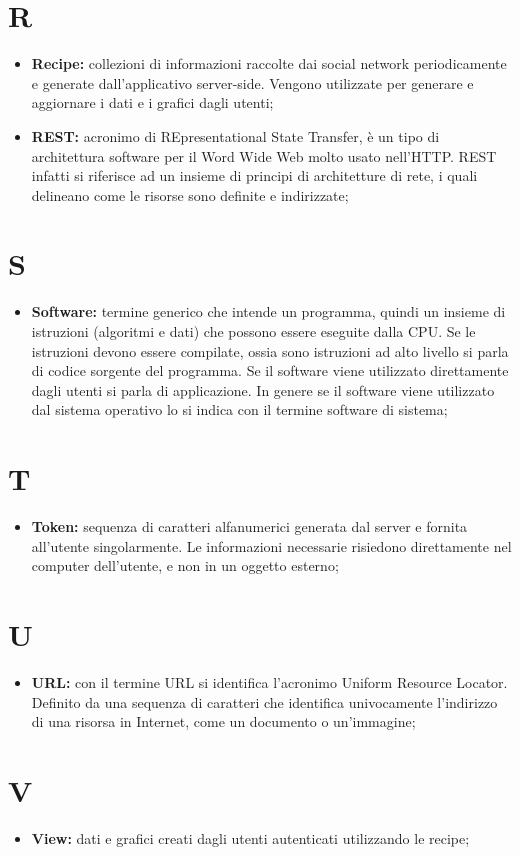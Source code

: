 	\section*{\Huge R} %
		\begin{itemize}
			\item \textbf{Recipe:} collezioni di informazioni raccolte dai social network periodicamente e generate dall'applicativo server-side. Vengono utilizzate per generare e aggiornare i dati e i grafici dagli utenti;
			\item \textbf{REST:} acronimo di REpresentational State Transfer, è un tipo di architettura software per il Word Wide Web molto usato nell'HTTP. REST infatti si riferisce ad un insieme di principi di architetture di rete, i quali delineano come le risorse sono definite e indirizzate;
			\end{itemize}


	\section*{\Huge S} %
		\begin{itemize}
			\item \textbf{Software:} termine generico che intende un programma, quindi un insieme di istruzioni (algoritmi e dati) che possono essere eseguite dalla CPU. Se le istruzioni devono essere compilate, ossia sono istruzioni ad alto livello si parla di codice sorgente del programma. Se il software viene utilizzato direttamente dagli utenti si parla di applicazione. In genere se il software viene utilizzato dal sistema operativo lo si indica con il termine software di sistema;
		\end{itemize}


	\section*{\Huge T} %
		\begin{itemize}
			\item \textbf{Token:} sequenza di caratteri alfanumerici generata dal server e fornita all'utente singolarmente. Le informazioni necessarie risiedono direttamente nel computer dell'utente, e non in un oggetto esterno;
		\end{itemize}


	\section*{\Huge U} %
		\begin{itemize}
			\item \textbf{URL:} con il termine URL si identifica l’acronimo Uniform Resource Locator. Definito da una sequenza di caratteri che identifica univocamente l’indirizzo di una risorsa in Internet, come un documento o un’immagine;
		\end{itemize}


	\section*{\Huge V} %
		\begin{itemize}
			\item \textbf{View:} dati e grafici creati dagli utenti autenticati utilizzando le recipe;
		\end{itemize}


